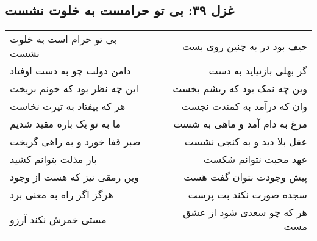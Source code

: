 \begin{center}
\section*{غزل ۳۹: بی تو حرامست به خلوت نشست}
\label{sec:039}
\begin{longtable}{l p{0.5cm} r}
بی تو حرام است به خلوت نشست
&&
حیف بود در به چنین روی بست
\\
دامن دولت چو به دست اوفتاد
&&
گر بهلی بازنیاید به دست
\\
این چه نظر بود که خونم بریخت
&&
وین چه نمک بود که ریشم بخست
\\
هر که بیفتاد به تیرت نخاست
&&
وان که درآمد به کمندت نجست
\\
ما به تو یک باره مقید شدیم
&&
مرغ به دام آمد و ماهی به شست
\\
صبر قفا خورد و به راهی گریخت
&&
عقل بلا دید و به کنجی نشست
\\
بار مذلت بتوانم کشید
&&
عهد محبت نتوانم شکست
\\
وین رمقی نیز که هست از وجود
&&
پیش وجودت نتوان گفت هست
\\
هرگز اگر راه به معنی برد
&&
سجده صورت نکند بت پرست
\\
مستی خمرش نکند آرزو
&&
هر که چو سعدی شود از عشق مست
\\
\end{longtable}
\end{center}
